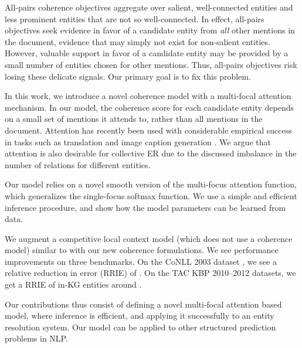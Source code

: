 

All-pairs coherence objectives aggregate over salient, well-connected
entities and less prominent entities that are not so well-connected.
In effect, all-pairs objectives seek evidence in favor of a candidate
entity from \emph{all} other mentions in the document, evidence that
may simply not exist for non-salient entities.  However, valuable
support in favor of a candidate entity may be provided by a small
number of entities chosen for other mentions.  Thus, all-pairs
objectives risk losing these delicate signals.  Our primary goal is to
fix this problem.

In this work, we introduce a novel coherence model with a multi-focal
attention mechanism. In our model, the coherence score for each
candidate entity depends on a small set of mentions it attends to,
rather than all mentions in the document. Attention has recently been
used with considerable empirical success in tasks such as translation
\cite{bahdanau2014neural} and image caption generation
\cite{xu2015show}. We argue that attention is also desirable for
collective ER due to the discussed imbalance in the number of
relations for different entities.

Our model relies on a novel smooth version of the multi-focus
attention function, which generalizes the single-focus softmax
function. We use a simple and efficient inference procedure, and show
how the model parameters can be learned from data.

We augment a competitive local context model (which does not use a
coherence model) similar to \cite{Lazic2015} with our new coherence
formulations.  We see performance improvements on three benchmarks.
On the CoNLL 2003 dataset \cite{Hoffart2011}, we see a relative
reduction in error (RRIE) of .  On the TAC KBP 2010--2012
datasets, we get a RRIE of in-KG entities around .

Our contributions thus consist of defining a novel multi-focal
attention based model, where inference is efficient, and applying it
successfully to an entity resolution system.  Our model can be applied
to other structured prediction problems in NLP.  

